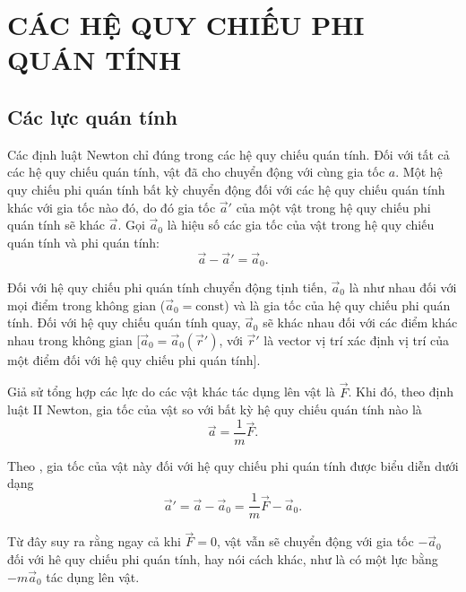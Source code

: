 

\chapter{CÁC HỆ QUY CHIẾU PHI QUÁN TÍNH}\label{chap:4}

\section{Các lực quán tính}\label{sec:4_1}

Các định luật Newton chỉ đúng trong các hệ quy chiếu quán tính. Đối với tất cả các hệ quy chiếu quán tính, vật đã cho chuyển động với cùng gia tốc $a$. Một hệ quy chiếu phi quán tính bất kỳ chuyển động đối với các hệ quy chiếu quán tính khác với gia tốc nào đó, do đó gia tốc $\vec{a}'$ của một vật trong hệ quy chiếu phi quán tính sẽ khác  $\vec{a}$. Gọi $\vec{a}_0$ là hiệu số các gia tốc của vật trong hệ quy chiếu quán tính và phi quán tính:
\begin{equation}\label{eq:4_1}
\vec{a} - \vec{a}' = \vec{a}_0.
\end{equation}

\noindent
Đối với hệ quy chiếu phi quán tính chuyển động tịnh tiến, $\vec{a}_0$ là như nhau đối với mọi điểm trong không gian ($\vec{a}_0=\text{const}$) và là gia tốc của hệ quy chiếu phi quán tính. Đối với hệ quy chiếu quán tính quay, $\vec{a}_0$ sẽ khác nhau đối với các điểm khác nhau trong không gian [$\vec{a}_0=\vec{a}_0(\vec{r}')$, với $\vec{r}'$ là vector vị trí xác định vị trí của một điểm đối với hệ quy chiếu phi quán tính].

Giả sử tổng hợp các lực do các vật khác tác dụng lên vật là $\vec{F}$. Khi đó, theo định luật II Newton, gia tốc của vật so với bất kỳ hệ quy chiếu quán tính nào là
\begin{equation*}
\vec{a} = \frac{1}{m}\vec{F}.
\end{equation*}

\noindent
Theo , gia tốc của vật này đối với hệ quy chiếu phi quán tính được biểu diễn dưới dạng
\begin{equation*}
\vec{a}' = \vec{a} - \vec{a}_0 = \frac{1}{m}\vec{F} - \vec{a}_0.
\end{equation*}

\noindent
Từ đây suy ra rằng ngay cả khi $\vec{F}=0$, vật vẫn sẽ chuyển động với gia tốc $-\vec{a}_0$ đối với hê quy chiếu phi quán tính, hay nói cách khác, như là có một lực bằng $-m\vec{a}_0$ tác dụng lên vật.

